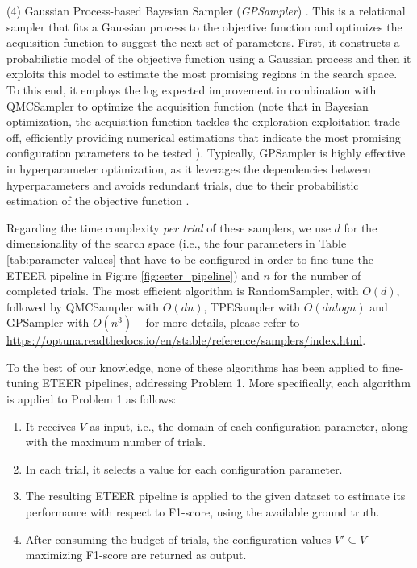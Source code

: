 (4) Gaussian Process-based Bayesian Sampler (\emph{GPSampler}) \cite{NIPS2012_GPSampler, QMCSampler}. This is a relational sampler that fits a Gaussian process to the objective function and optimizes the acquisition function to suggest the next set of parameters. First,
    it constructs a probabilistic model of the objective function using a Gaussian process and then it exploits this model to estimate the most promising regions in the search space. 
    To this end, it employs the log expected improvement 
    in combination with QMCSampler
    to optimize the acquisition function (note that in Bayesian optimization, the acquisition function tackles the exploration-exploitation trade-off, efficiently providing numerical estimations that indicate the most promising configuration parameters to be tested \cite{DBLP:conf/nips/WilsonHD18}).
    Typically, GPSampler is highly effective in hyperparameter optimization,
    as it leverages the dependencies between hyperparameters and avoids redundant trials, due to their probabilistic estimation of the objective function \cite{NIPS2012_GPSampler, QMCSampler}. 

Regarding the time complexity \textit{per trial} of these samplers, we use $d$ for the dimensionality of the search space {(i.e., the four parameters in Table \ref{tab:parameter-values} that have to be configured in order to fine-tune the ETEER pipeline in Figure \ref{fig:eeter_pipeline})} and $n$ for the number of completed trials. The most efficient algorithm is RandomSampler, with $O(d)$, followed by QMCSampler with $O(d n )$, TPESampler with $O(d n logn)$ and GPSampler with $O(n^3)$ -- for more details, please refer to {\footnotesize \underline{https://optuna.readthedocs.io/en/stable/reference/samplers/index.html}}.

To the best of our knowledge, none of these algorithms has been applied to fine-tuning ETEER pipelines, addressing Problem 1. More specifically, each algorithm is applied to Problem 1 as follows: 
\begin{enumerate}[leftmargin=*]
    \item It receives $V$ as input, i.e., the domain of each configuration parameter, along with the maximum number of trials.
    \item In each trial, it selects a value for each configuration parameter.
    \item The resulting ETEER pipeline is applied to the given dataset to estimate its performance with respect to F1-score, using the available ground truth.
    \item After consuming the budget of trials, the configuration values $V' \subseteq V$ maximizing F1-score are returned as output.
\end{enumerate}



